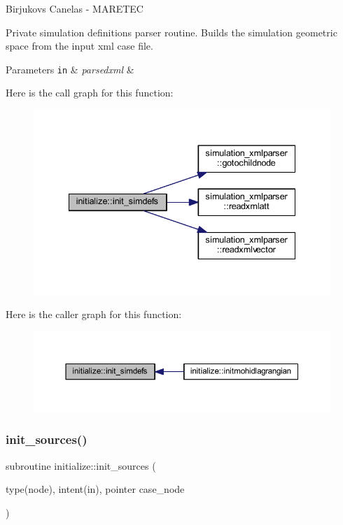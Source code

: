 Birjukovs Canelas -\/ M\+A\+R\+E\+T\+EC 

Private simulation definitions parser routine. Builds the simulation geometric space from the input xml case file. 
\begin{DoxyParams}[1]{Parameters}
\mbox{\tt in}  & {\em parsedxml} & \\
\hline
\end{DoxyParams}
Here is the call graph for this function\+:\nopagebreak
\begin{figure}[H]
\begin{center}
\leavevmode
\includegraphics[width=335pt]{namespaceinitialize_adb972e92da4789506ee6b62b702df2b3_cgraph}
\end{center}
\end{figure}
Here is the caller graph for this function\+:\nopagebreak
\begin{figure}[H]
\begin{center}
\leavevmode
\includegraphics[width=350pt]{namespaceinitialize_adb972e92da4789506ee6b62b702df2b3_icgraph}
\end{center}
\end{figure}
\mbox{\label{namespaceinitialize_a9ed75476e5dd07928aed3442281930be}} 
\subsubsection{\texorpdfstring{init\+\_\+sources()}{init\_sources()}}
{\footnotesize\ttfamily subroutine initialize\+::init\+\_\+sources (\begin{DoxyParamCaption}\item[{type(node), intent(in), pointer}]{case\+\_\+node }\end{DoxyParamCaption})\hspace{0.3cm}{\ttfamily [private]}}



